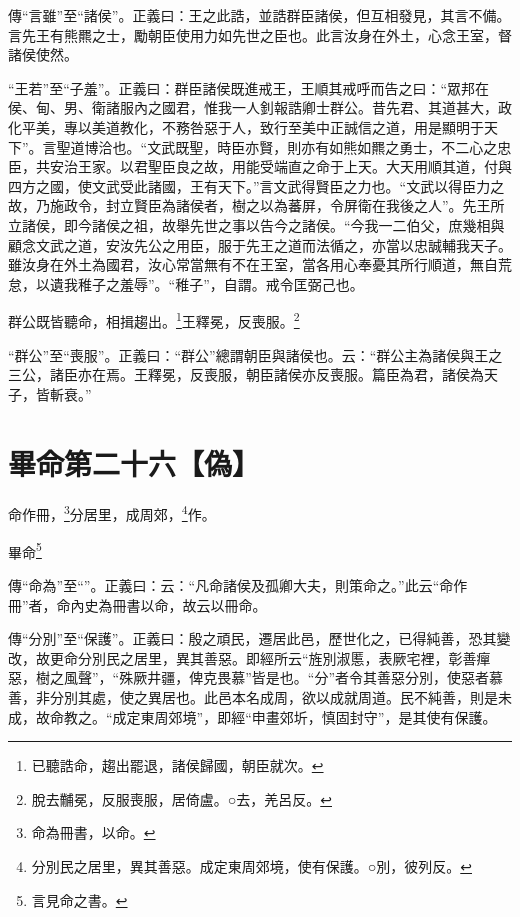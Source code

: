 {\noindent\zhuan{}\fzbyks 傳“言雖”至“諸侯”。正義曰：王之此誥，並誥群臣諸侯，但互相發見，其言不備。言先王有熊羆之士，勵朝臣使用力如先世之臣也。此言汝身在外土，心念王室，督諸侯使然。 \par}

{\noindent\shu{}\fzkt “王若”至“子羞”。正義曰：群臣諸侯既進戒王，王順其戒呼而告之曰：“眾邦在侯、甸、男、衛諸服內之國君，惟我一人釗報誥卿士群公。昔先君、其道甚大，政化平美，專以美道教化，不務咎惡于人，致行至美中正誠信之道，用是顯明于天下”。言聖道博洽也。“文武既聖，時臣亦賢，則亦有如熊如羆之勇士，不二心之忠臣，共安治王家。以君聖臣良之故，用能受端直之命于上天。大天用順其道，付與四方之國，使文武受此諸國，王有天下。”言文武得賢臣之力也。“文武以得臣力之故，乃施政令，封立賢臣為諸侯者，樹之以為蕃屏，令屏衛在我後之人”。先王所立諸侯，即今諸侯之祖，故舉先世之事以告今之諸侯。“今我一二伯父，庶幾相與顧念文武之道，安汝先公之用臣，服于先王之道而法循之，亦當以忠誠輔我天子。雖汝身在外土為國君，汝心常當無有不在王室，當各用心奉憂其所行順道，無自荒怠，以遺我稚子之羞辱”。“稚子”，自謂。戒令匡弼己也。 \par}

群公既皆聽命，相揖趨出。\footnote{已聽誥命，趨出罷退，諸侯歸國，朝臣就次。}王釋冕，反喪服。\footnote{脫去黼冕，反服喪服，居倚盧。○去，羌呂反。}

{\noindent\shu{}\fzkt “群公”至“喪服”。正義曰：“群公”總謂朝臣與諸侯也。云：“群公主為諸侯與王之三公，諸臣亦在焉。王釋冕，反喪服，朝臣諸侯亦反喪服。篇臣為君，諸侯為天子，皆斬衰。” \par}

\section{畢命第二十六【偽】}


命作冊，\footnote{命為冊書，以命。}分居里，成周郊，\footnote{分別民之居里，異其善惡。成定東周郊境，使有保護。○別，彼列反。}作。

畢命\footnote{言見命之書。}


{\noindent\zhuan{}\fzbyks 傳“命為”至“”。正義曰：云：“凡命諸侯及孤卿大夫，則策命之。”此云“命作冊”者，命內史為冊書以命，故云以冊命。 \par}

{\noindent\zhuan{}\fzbyks 傳“分別”至“保護”。正義曰：殷之頑民，遷居此邑，歷世化之，已得純善，恐其變改，故更命分別民之居里，異其善惡。即經所云“旌別淑慝，表厥宅裡，彰善癉惡，樹之風聲”，“殊厥井疆，俾克畏慕”皆是也。“分”者令其善惡分別，使惡者慕善，非分別其處，使之異居也。此邑本名成周，欲以成就周道。民不純善，則是未成，故命教之。“成定東周郊境”，即經“申畫郊圻，慎固封守”，是其使有保護。 \par}

